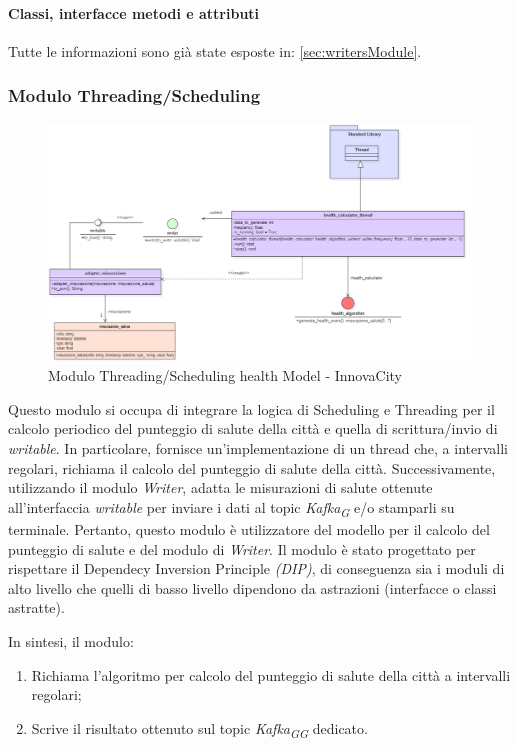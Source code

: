 \paragraph*{Classi, interfacce metodi e attributi}
Tutte le informazioni sono già state esposte in: \ref{sec:writersModule}.

\subsubsection{Modulo Threading/Scheduling}
\begin{figure}[H]
    \centering
    \includegraphics[width=1\textwidth]{../Images/SpecificaTecnica/healthThreading.PNG}
    \caption{Modulo Threading/Scheduling health Model - InnovaCity}
    \label{fig: threadHealth}
\end{figure}

Questo modulo si occupa di integrare la logica di Scheduling e Threading per il calcolo periodico del punteggio di salute della città e quella di scrittura/invio di \textit{writable}. In particolare, fornisce un'implementazione di un thread che, a intervalli regolari, richiama il calcolo del punteggio di salute della città. Successivamente, utilizzando il modulo \textit{Writer}, adatta le misurazioni di salute ottenute all'interfaccia \textit{writable} per inviare i dati al topic \textit{Kafka}\textsubscript{\textit{G}} e/o stamparli su terminale. Pertanto, questo modulo è utilizzatore del modello per il calcolo del punteggio di salute e del modulo di \textit{Writer}.
Il modulo è stato progettato per rispettare il Dependecy Inversion Principle \textit{(DIP)}, di conseguenza sia i moduli di alto livello che quelli di basso livello dipendono da astrazioni (interfacce o classi astratte).

In sintesi, il modulo:
    \begin{enumerate}
        \item Richiama l'algoritmo per calcolo del punteggio di salute della città a intervalli regolari;
        \item Scrive il risultato ottenuto sul topic \textit{Kafka}\textsubscript{\textit{G}}\textsubscript{\textit{G}} dedicato.
    \end{enumerate}

